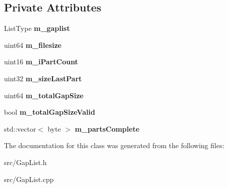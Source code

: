 \subsection*{Private Attributes}
\begin{DoxyCompactItemize}
\item 
ListType {\bfseries m\_\-gaplist}\label{classCGapList_a8a5bda98dcc38b5aeafa1955334aaf78}

\item 
uint64 {\bfseries m\_\-filesize}\label{classCGapList_a1fa94367058810d9d4142f1ae734ebf0}

\item 
uint16 {\bfseries m\_\-iPartCount}\label{classCGapList_a1727e272eb9ec47a22ef1dd0e886fa01}

\item 
uint32 {\bfseries m\_\-sizeLastPart}\label{classCGapList_ac1adfd3747dc7653ef13a38df7051452}

\item 
uint64 {\bfseries m\_\-totalGapSize}\label{classCGapList_af8080cec35113abcc17e2ef0ceaaaffb}

\item 
bool {\bfseries m\_\-totalGapSizeValid}\label{classCGapList_a6932b80af00e3de9fd9e22140f325427}

\item 
std::vector$<$ byte $>$ {\bfseries m\_\-partsComplete}\label{classCGapList_a3a756e88df87f2ae3a30ca29adf50084}

\end{DoxyCompactItemize}


The documentation for this class was generated from the following files:\begin{DoxyCompactItemize}
\item 
src/GapList.h\item 
src/GapList.cpp\end{DoxyCompactItemize}
